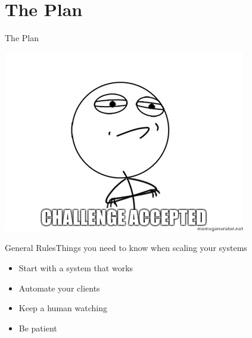 \documentclass[utf8]{beamer}
\begin{document}
\section{The Plan}
\begin{frame}{The Plan}
	\begin{center}
		\includegraphics[width=.65\textwidth]{img/challengeaccepted.jpg}
	\end{center}
\end{frame}

\begin{frame}{General Rules}{Things you need to know when scaling your systems}
	\begin{itemize}
		\item<1> Start with a system that \alert{works}
		\item<2> Automate your clients
		\item<3> Keep a human watching
		\item<4> Be patient
	\end{itemize}
\end{frame}
\end{document}
